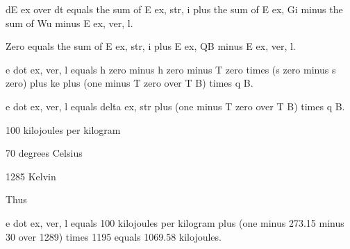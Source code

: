 dE ex over dt equals the sum of E ex, str, i plus the sum of E ex, Gi minus the sum of Wu minus E ex, ver, l.

Zero equals the sum of E ex, str, i plus E ex, QB minus E ex, ver, l.

e dot ex, ver, l equals h zero minus h zero minus T zero times (s zero minus s zero) plus ke plus (one minus T zero over T B) times q B.

e dot ex, ver, l equals delta ex, str plus (one minus T zero over T B) times q B.

100 kilojoules per kilogram

70 degrees Celsius

1285 Kelvin

Thus

e dot ex, ver, l equals 100 kilojoules per kilogram plus (one minus 273.15 minus 30 over 1289) times 1195 equals 1069.58 kilojoules.